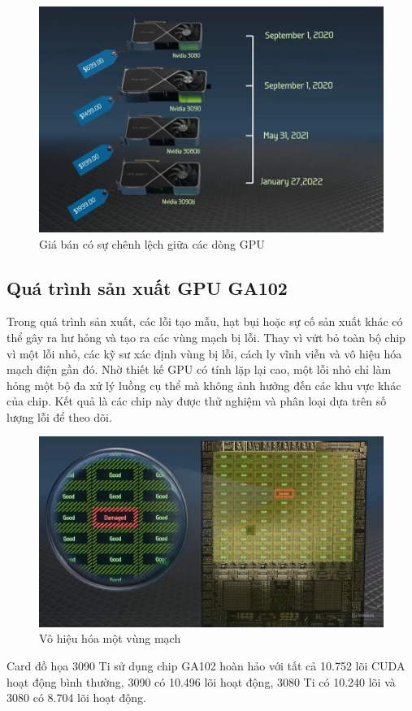 \documentclass[a4paper]{article}
\begin{document}
\begin{figure}
    \centering
    \includegraphics[width=0.75\linewidth]{assets/gpu8.png}
    \caption{Giá bán có sự chênh lệch giữa các dòng GPU}
    \label{fig:enter-label}
\end{figure}
    
\subsection{Quá trình sản xuất GPU GA102}

Trong quá trình sản xuất, các lỗi tạo mẫu, hạt bụi hoặc sự cố sản xuất khác có thể gây ra hư hỏng và tạo ra các vùng mạch bị lỗi. Thay vì vứt bỏ toàn bộ chip vì một lỗi nhỏ, các kỹ sư xác định vùng bị lỗi, cách ly vĩnh viễn và vô hiệu hóa mạch điện gần đó. Nhờ thiết kế GPU có tính lặp lại cao, một lỗi nhỏ chỉ làm hỏng một bộ đa xử lý luồng cụ thể mà không ảnh hưởng đến các khu vực khác của chip. Kết quả là các chip này được thử nghiệm và phân loại dựa trên số lượng lỗi để theo dõi.
    
\begin{figure}
    \centering
    \includegraphics[width=0.75\linewidth]{gpu9.png}
    \caption{Vô hiệu hóa một vùng mạch}
    \label{fig:enter-label}
\end{figure}
    
Card đồ họa 3090 Ti sử dụng chip GA102 hoàn hảo với tất cả 10.752 lõi CUDA hoạt động bình thường, 3090 có 10.496 lõi hoạt động, 3080 Ti có 10.240 lõi và 3080 có 8.704 lõi hoạt động.
    
\end{document}
